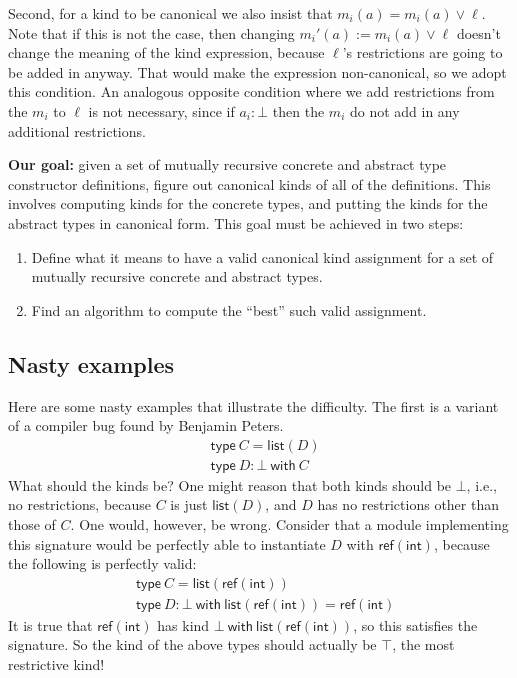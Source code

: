 \documentclass{article}
\begin{document}
Second, for a kind to be canonical we also insist that $m_i(a) = m_i(a) \vee \ell$. Note that if this is not the case, then changing $m_i'(a) := m_i(a) \vee \ell$ doesn't change the meaning of the kind expression, because $\ell$'s restrictions are going to be added in anyway. That would make the expression non-canonical, so we adopt this condition. An analogous opposite condition where we add restrictions from the $m_i$ to $\ell$ is not necessary, since if $a_i : \bot$ then the $m_i$ do not add in any additional restrictions.

\textbf{Our goal: } given a set of mutually recursive concrete and abstract type constructor definitions, figure out canonical kinds of all of the definitions.
This involves computing kinds for the concrete types, and putting the kinds for the abstract types in canonical form.
This goal must be achieved in two steps:
\begin{enumerate}
    \item Define what it means to have a valid canonical kind assignment for a set of mutually recursive concrete and abstract types.
    \item Find an algorithm to compute the ``best'' such valid assignment.
\end{enumerate}

\subsection*{Nasty examples}

Here are some nasty examples that illustrate the difficulty.
The first is a variant of a compiler bug found by Benjamin Peters.
\begin{align*}
    &\mathsf{type\ } C = \mathsf{list}(D)\\
    &\mathsf{type\ } D : \bot \mathsf{\ with\ } C
\end{align*}
What should the kinds be? One might reason that both kinds should be $\bot$, i.e., no restrictions, because $C$ is just $\mathsf{list}(D)$, and $D$ has no restrictions other than those of $C$. One would, however, be wrong. Consider that a module implementing this signature would be perfectly able to instantiate $D$ with $\mathsf{ref(int)}$, because the following is perfectly valid:
\begin{align*}
    &\mathsf{type\ } C = \mathsf{list}(\mathsf{ref(int)})\\
    &\mathsf{type\ } D : \bot \mathsf{\ with\ } \mathsf{list(ref(int))} = \mathsf{ref(int)}
\end{align*}
It is true that $\mathsf{ref(int)}$ has kind $\bot \mathsf{\ with\ } \mathsf{list(ref(int))}$, so this satisfies the signature. So the kind of the above types should actually be $\top$, the most restrictive kind!
\end{document}
